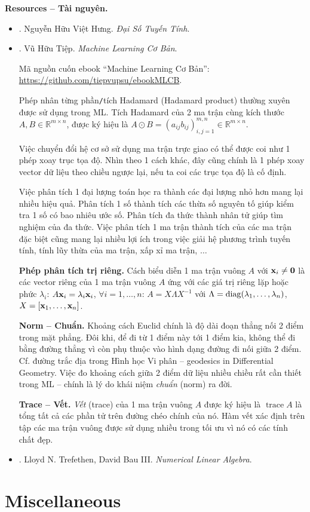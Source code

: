 \documentclass{article}
\begin{document}
\noindent\textbf{\textsf{Resources -- Tài nguyên.}}
\begin{itemize}
	\item \cite{Hung_linear_algebra}. {\sc Nguyễn Hữu Việt Hưng}. {\it Đại Số Tuyến Tính}.
	\item \cite{Tiep_ML_co_ban}. {\sc Vũ Hữu Tiệp}. {\it Machine Learning Cơ Bản}.
	
	Mã nguồn cuốn ebook ``Machine Learning Cơ Bản'': \url{https://github.com/tiepvupsu/ebookMLCB}.
	
	Phép nhân từng phần{\tt/}tích Hadamard (Hadamard product) thường xuyên được sử dụng trong ML. Tích Hadamard của 2 ma trận cùng kích thước $A,B\in\mathbb{R}^{m\times n}$, được ký hiệu là $A\odot B = (a_{ij}b_{ij})_{i,j=1}^{m,n}\in\mathbb{R}^{m\times n}$.
	
	Việc chuyển đổi hệ cơ sở sử dụng ma trận trực giao có thể được coi như 1 phép xoay trục tọa độ. Nhìn theo 1 cách khác, đây cũng chính là 1 phép xoay vector dữ liệu theo chiều ngược lại, nếu ta coi các trục tọa độ là cố định.
	
	Việc phân tích 1 đại lượng toán học ra thành các đại lượng nhỏ hơn mang lại nhiều hiệu quả. Phân tích 1 số thành tích các thừa số nguyên tố giúp kiểm tra 1 số có bao nhiêu ước số. Phân tích đa thức thành nhân tử giúp tìm nghiệm của đa thức. Việc phân tích 1 ma trận thành tích của các ma trận đặc biệt cũng mang lại nhiều lợi ích trong việc giải hệ phương trình tuyến tính, tính lũy thừa của ma trận, xấp xỉ ma trận, $\ldots$
	
	{\bf Phép phân tích trị riêng.} Cách biểu diễn 1 ma trận vuông $A$ với ${\bf x}_i\ne{\bf 0}$ là các vector riêng của 1 ma trận vuông $A$ ứng với các giá trị riêng lặp hoặc phức $\lambda_i$: $A{\bf x}_i = \lambda_i{\bf x}_i$, $\forall i = 1,\ldots,n$: $A = X\Lambda X^{-1}$ với $\Lambda = {\rm diag}(\lambda_1,\ldots,\lambda_n)$, $X = [{\bf x}_1,\ldots,{\bf x}_n]$.
	
	{\bf Norm -- Chuẩn.} Khoảng cách Euclid chính là độ dài đoạn thẳng nối 2 điểm trong mặt phẳng. Đôi khi, để đi từ 1 điểm này tới 1 điểm kia, không thể đi bằng đường thẳng vì còn phụ thuộc vào hình dạng đường đi nối giữa 2 điểm. Cf. đường trắc địa trong Hình học Vi phân -- geodesics in Differential Geometry. Việc đo khoảng cách giữa 2 điểm dữ liệu nhiều chiều rất cần thiết trong ML -- chính là lý do khái niệm {\it chuẩn} (norm) ra đời.
	
	{\bf Trace -- Vết.} {\it Vết} (trace) của 1 ma trận vuông $A$ được ký hiệu là $\operatorname{trace}A$ là tổng tất cả các phần tử trên đường chéo chính của nó. Hàm vết xác định trên tập các ma trận vuông được sử dụng nhiều trong tối ưu vì nó có các tính chất đẹp.
	\item \cite{Trefethen_Bau1997,Trefethen_Bau2022}. {\sc Lloyd N. Trefethen, David Bau III}. {\it Numerical Linear Algebra}.
\end{itemize}



\section{Miscellaneous}


\printbibliography[heading=bibintoc]
	
\end{document}
